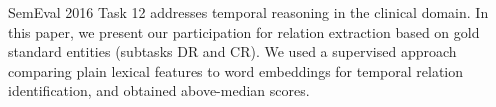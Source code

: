 SemEval 2016 Task 12 addresses temporal reasoning in the clinical domain. In this paper, we present our participation for relation extraction based on gold standard entities (subtasks DR and CR). We used a supervised approach comparing plain lexical features to word embeddings for temporal relation identification, and obtained above-median scores.
